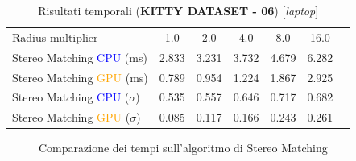 \documentclass[12pt,a4paper]{report}
\begin{document}
\begin{table}[H]
    \centering
    \caption{Risultati temporali (\textbf{KITTY DATASET - 06}) [\textit{laptop}] }
    \begin{tabular}{lcccccc}
        \toprule
        \rowcolor{gray!20}
        Radius multiplier & 1.0 & \cellcolor{orange!40}2.0 & 4.0 & 8.0 & 16.0 \\
        Stereo Matching \textcolor{blue}{CPU} (ms) & 2.833 & 3.231 & 3.732 & 4.679 & 6.282 \\
        Stereo Matching \textcolor{orange}{GPU} (ms) & 0.789 & 0.954 & 1.224 & 1.867 & 2.925 \\
        Stereo Matching \textcolor{blue}{CPU} ($\sigma$) & 0.535 & 0.557 & 0.646 & 0.717 & 0.682\\
        Stereo Matching \textcolor{orange}{GPU} ($\sigma$) & 0.085 & 0.117 & 0.166 & 0.243 & 0.261 \\
        \bottomrule
    \end{tabular}
\end{table}

\begin{figure}[H]
    \centering
    \caption{Comparazione dei tempi sull'algoritmo di Stereo Matching }
\end{figure}

\end{document}
